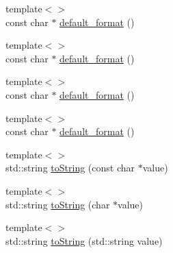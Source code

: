 \begin{DoxyCompactItemize}
\item 
{\footnotesize template$<$$>$ }\\const char $\ast$ \hyperlink{struct_d_d4hep_1_1_primitive_a7b261a0502c9f17fd5180f118958c814}{default\_\-format} ()
\item 
{\footnotesize template$<$$>$ }\\const char $\ast$ \hyperlink{struct_d_d4hep_1_1_primitive_a464da9a73ca2751bea50801562e6019d}{default\_\-format} ()
\item 
{\footnotesize template$<$$>$ }\\const char $\ast$ \hyperlink{struct_d_d4hep_1_1_primitive_a0367c6b91b193c28a8ef1ad835eca551}{default\_\-format} ()
\item 
{\footnotesize template$<$$>$ }\\const char $\ast$ \hyperlink{struct_d_d4hep_1_1_primitive_a28601844d9c59585b654e55746d571a7}{default\_\-format} ()
\item 
{\footnotesize template$<$$>$ }\\std::string \hyperlink{struct_d_d4hep_1_1_primitive_a418ae5c5cf4ff6477b59da99fc616895}{toString} (const char $\ast$value)
\item 
{\footnotesize template$<$$>$ }\\std::string \hyperlink{struct_d_d4hep_1_1_primitive_abcc89d7824eaf764777b38330a727497}{toString} (char $\ast$value)
\item 
{\footnotesize template$<$$>$ }\\std::string \hyperlink{struct_d_d4hep_1_1_primitive_aa15bf6fc96f8a4673ecea28479fcf38d}{toString} (std::string value)
\end{DoxyCompactItemize}
